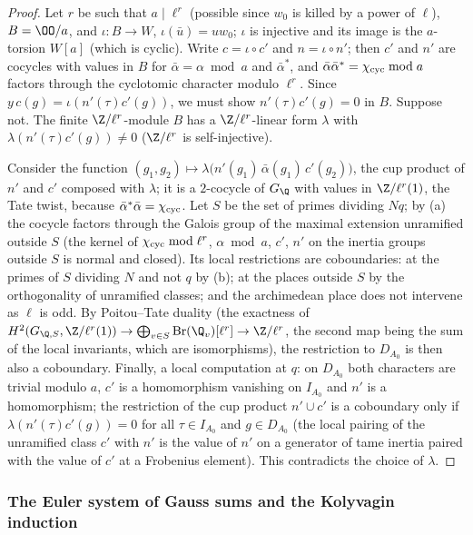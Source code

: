 \begin{proof}
Let $r$ be such that $a\mid\ell^r$ (possible since $w_0$ is killed by a power of $\ell$), $B=\OO/a$, and $\iota:B\to W$, $\iota(\bar u)=uw_0$;
$\iota$ is injective and its image is the $a$-torsion $W[a]$ (which is cyclic). Write $c=\iota\circ c'$ and $n=\iota\circ n'$; then $c'$ and $n'$
are cocycles with values in $B$ for $\bar\alpha=\alpha\bmod a$ and $\bar\alpha^*$, and $\bar\alpha\bar\alpha^*=\chi_{\mathrm{cyc}}\bmod a$ factors
through the cyclotomic character modulo $\ell^r$. Since $y\,c(g)=\iota(n'(\tau)c'(g))$, we must show $n'(\tau)c'(g)=0$ in $B$. Suppose not.
The finite $\Z/\ell^r$-module $B$ has a $\Z/\ell^r$-linear form $\lambda$ with $\lambda(n'(\tau)c'(g))\ne0$ ($\Z/\ell^r$ is self-injective).

Consider the function $(g_1,g_2)\mapsto\lambda\bigl(n'(g_1)\,\bar\alpha(g_1)\,c'(g_2)\bigr)$, the cup product of $n'$ and $c'$ composed with
$\lambda$; it is a $2$-cocycle of $G_\Q$ with values in $\Z/\ell^r(1)$, the Tate twist, because $\bar\alpha^*\bar\alpha=\chi_{\mathrm{cyc}}$. Let $S$
be the set of primes dividing $Nq$; by (a) the cocycle factors through the Galois group of the maximal extension unramified outside $S$
(the kernel of $\chi_{\mathrm{cyc}}\bmod\ell^r$, $\alpha\bmod a$, $c'$, $n'$ on the inertia groups outside $S$ is normal and closed). Its local
restrictions are coboundaries: at the primes of $S$ dividing $N$ and not $q$ by (b); at the places outside $S$ by the orthogonality of
unramified classes; and the archimedean place does not intervene as $\ell$ is odd. By Poitou--Tate duality (the exactness of
$H^2(G_{\Q,S},\Z/\ell^r(1))\to\bigoplus_{v\in S}\mathrm{Br}(\Q_v)[\ell^r]\to\Z/\ell^r$, the second map being the sum of the local invariants,
which are isomorphisms), the restriction to $D_{A_0}$ is then also a coboundary. Finally, a local computation at $q$: on $D_{A_0}$ both
characters are trivial modulo $a$, $c'$ is a homomorphism vanishing on $I_{A_0}$ and $n'$ is a homomorphism; the restriction of the cup product
$n'\cup c'$ is a coboundary only if $\lambda(n'(\tau)c'(g))=0$ for all $\tau\in I_{A_0}$ and $g\in D_{A_0}$ (the local pairing of the unramified
class $c'$ with $n'$ is the value of $n'$ on a generator of tame inertia paired with the value of $c'$ at a Frobenius element). This
contradicts the choice of $\lambda$.
\end{proof}

\subsubsection{The Euler system of Gauss sums and the Kolyvagin induction}

